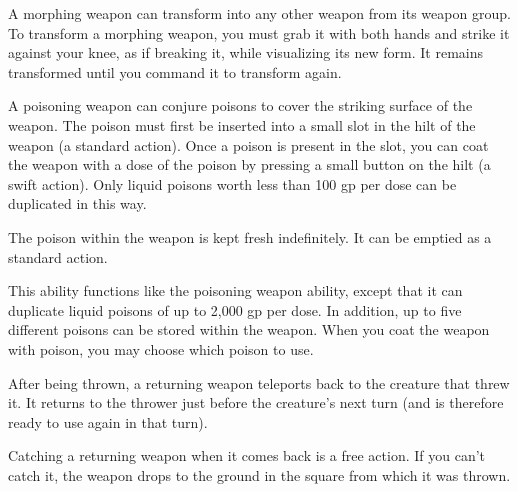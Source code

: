 
 A morphing weapon can transform into any other weapon from its weapon group. To transform a morphing weapon, you must grab it with both hands and strike it against your knee, as if breaking it, while visualizing its new form. It remains transformed until you command it to transform again.


 A poisoning weapon can conjure poisons to cover the striking surface of the weapon. The poison must first be inserted into a small slot in the hilt of the weapon (a standard action). Once a poison is present in the slot, you can coat the weapon with a dose of the poison by pressing a small button on the hilt (a swift action). Only liquid poisons worth less than 100 gp per dose can be duplicated in this way. 

The poison within the weapon is kept fresh indefinitely. It can be emptied as a standard action. 


 This ability functions like the poisoning weapon ability, except that it can duplicate liquid poisons of up to 2,000 gp per dose. In addition, up to five different poisons can be stored within the weapon. When you coat the weapon with poison, you may choose which poison to use. 


 After being thrown, a returning weapon teleports back to the creature that threw it. It returns to the thrower just before the creature's next turn (and is therefore ready to use again in that turn).

Catching a returning weapon when it comes back is a free action. If you can't catch it, the weapon drops to the ground in the square from which it was thrown.

